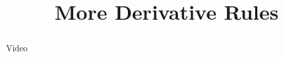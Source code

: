 \documentclass[handout]{ximera}
\title{More Derivative Rules}
\begin{document}
\begin{abstract} Video %
\end{abstract}

\maketitle

\end{document}
